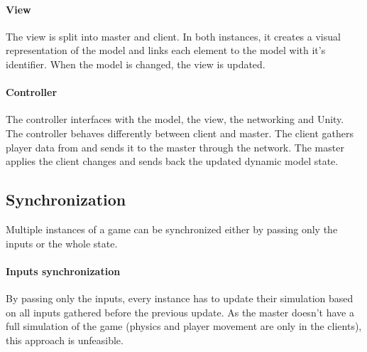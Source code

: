 \documentclass[12pt]{article}
\begin{document}
\paragraph{View}
The view is split into master and client. In both instances, it creates a visual representation of the model and links each element to the model with it's identifier. When the model is changed, the view is updated.
\paragraph{Controller}
The controller interfaces with the model, the view, the networking and Unity. The controller behaves differently between client and master. The client gathers player data from and sends it to the master through the network. The master applies the client changes and sends back the updated dynamic model state. 

\clearpage

\subsection{Synchronization}
Multiple instances of a game can be synchronized either by passing only the inputs or the whole state.

\paragraph{Inputs synchronization}
By passing only the inputs, every instance has to update their simulation based on all inputs gathered before the previous update. As the master doesn't have a full simulation of the game (physics and player movement are only in the clients), this approach is unfeasible.
\end{document}

